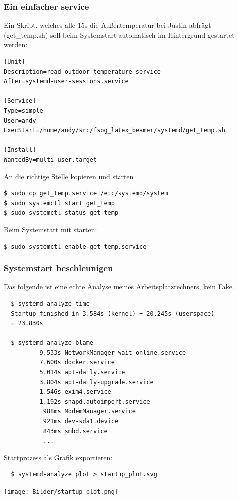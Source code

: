 \begin{frame}[fragile]
\frametitle{Ein einfacher service}

  Ein Skript, welches alle 15s die Außentemperatur bei Justin abfrägt (get\_temp.sh)
  soll beim Systemstart automatisch im Hintergrund gestartet werden:

\begin{verbatim}
[Unit]
Description=read outdoor temperature service
After=systemd-user-sessions.service

[Service]
Type=simple
User=andy
ExecStart=/home/andy/src/fsog_latex_beamer/systemd/get_temp.sh

[Install]
WantedBy=multi-user.target
\end{verbatim}

\end{frame}

\begin{frame}[fragile]

An die richtige Stelle kopieren und starten
\begin{verbatim}
$ sudo cp get_temp.service /etc/systemd/system
$ sudo systemctl start get_temp
$ sudo systemctl status get_temp
\end{verbatim}

Beim Systemstart mit starten:
\begin{verbatim}
$ sudo systemctl enable get_temp.service
\end{verbatim}

\end{frame}

\begin{frame}[fragile]
  \frametitle{Systemstart beschleunigen}

  Das folgende ist eine echte Analyse meines Arbeitsplatzrechners, kein Fake.
\begin{verbatim}
  $ systemd-analyze time
  Startup finished in 3.584s (kernel) + 20.245s (userspace)
  = 23.830s

  $ systemd-analyze blame
          9.533s NetworkManager-wait-online.service
          7.600s docker.service
          5.014s apt-daily.service
          3.804s apt-daily-upgrade.service
          1.546s exim4.service
          1.192s snapd.autoimport.service
           988ms ModemManager.service
           921ms dev-sda1.device
           843ms smbd.service
           ...
\end{verbatim}
\end{frame}

\begin{frame}[fragile]

  Startprozess als Grafik exportieren:
  \begin{verbatim}
  $ systemd-analyze plot > startup_plot.svg
  \end{verbatim}
  \texttt{[image: Bilder/startup\_plot.png]}

\end{frame}

